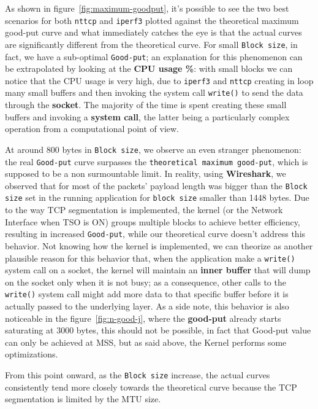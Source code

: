 \documentclass{exam}
\begin{document}
As shown in figure~\ref{fig:maximum-goodput}, it's possible to see the two best scenarios for both \texttt{nttcp} and \texttt{iperf3} plotted against the theoretical maximum good-put curve and what immediately catches the eye is that the actual curves are significantly different from the theoretical curve.
For small \verb|Block size|, in fact, we have a sub-optimal \verb|Good-put|; an explanation for this phenomenon can be extrapolated by looking at the \textbf{CPU usage \%}: with small blocks we can notice that the CPU usage is very high, due to \texttt{iperf3} and \texttt{nttcp} creating in loop many small buffers and then invoking the system call \texttt{write()} to send the data through the \textbf{socket}. The majority of the time is spent creating these small buffers and invoking a \textbf{system call}, the latter being a particularly complex operation from a computational point of view.

At around 800 bytes in \verb|Block size|, we observe an even stranger phenomenon: the real \verb|Good-put| curve surpasses the \verb|theoretical maximum good-put|, which is supposed to be a non surmountable limit. In reality, using \textbf{Wireshark}, we observed that for most of the packets' payload length was bigger than the \verb|Block size| set in the running application for \verb|block size| smaller than 1448 bytes.
Due to the way TCP segmentation is implemented, the kernel (or the Network Interface when TSO is ON) groups multiple blocks to achieve better efficiency, resulting in increased \verb|Good-put|, while our theoretical curve doesn't address this behavior. Not knowing how the kernel is implemented, we can theorize as another plausible reason for this behavior that, when the application make a \texttt{write()} system call on a socket, the kernel will maintain an \textbf{inner buffer} that will dump on the socket only when it is not busy; as a consequence, other calls to the \texttt{write()} system call might add more data to that specific buffer before it is actually passed to the underlying layer. 
As a side note, this behavior is also noticeable in the figure~\ref{fig:n-good-j}, where the \textbf{good-put} already starts saturating at 3000 bytes, this should not be possible, in fact that Good-put value can only be achieved at MSS, but as said above, the Kernel performs some optimizations.

From this point onward, as the \verb|Block size| increase, the actual curves consistently tend more closely towards the theoretical curve because the TCP segmentation is limited by the MTU size.
\end{document}
